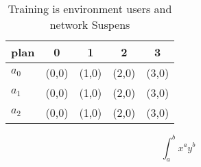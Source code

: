 \documentclass[a4paper]{article}
\begin{document}
\begin{table}
\begin{adjustbox}{width=0.5\columnwidth}
\begin{tabular}{|l|l|l|l|l|}
\hline
\textbf{plan} & \multicolumn{1}{c|}{\textbf{0}} & \multicolumn{1}{c|}{\textbf{1}} & \multicolumn{1}{c|}{\textbf{2}} & \multicolumn{1}{c|}{\textbf{3}} \\ \hline
\textbf{$a_0$}  & (0,0) & (1,0) & (2,0) & (3,0) \\ \hline
\textbf{$a_1$}  & (0,0) & (1,0) & (2,0) & (3,0) \\ \hline
\textbf{$a_2$}  & (0,0) & (1,0) & (2,0) & (3,0) \\ \hline
\end{tabular}
\end{adjustbox}
\caption{Training is environment users and network Suspens
}
\end{table}

\[ \int_{a}^{b}{x^{a}y^{b}} \]
\end{document}
